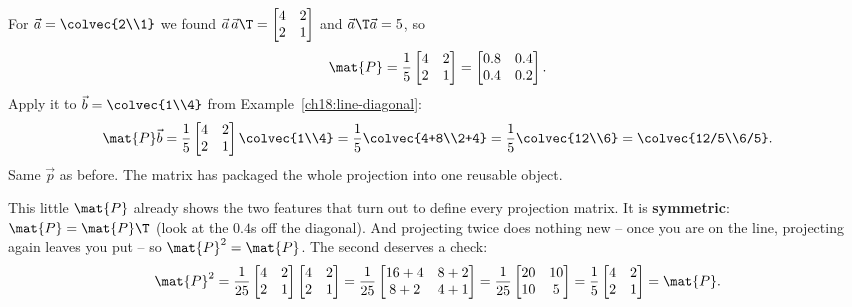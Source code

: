 \begin{example}\label{ch18:line-Pmatrix}
For $\vec{a}=\colvec{2\\1}$ we found $\vec{a}\,\vec{a}\T=\begin{bmatrix}4&2\\2&1\end{bmatrix}$ and
$\vec{a}\T\vec{a}=5$, so
\[
  \mat{P} = \frac{1}{5}\begin{bmatrix} 4 & 2 \\ 2 & 1\end{bmatrix}
          = \begin{bmatrix} 0.8 & 0.4 \\ 0.4 & 0.2 \end{bmatrix}.
\]
Apply it to $\vec{b}=\colvec{1\\4}$ from Example~\ref{ch18:line-diagonal}:
\[
  \mat{P}\vec{b} = \frac{1}{5}\begin{bmatrix}4&2\\2&1\end{bmatrix}\colvec{1\\4}
  = \frac{1}{5}\colvec{4+8\\2+4} = \frac{1}{5}\colvec{12\\6} = \colvec{12/5\\6/5}.
\]
Same $\vec{p}$ as before. The matrix has packaged the whole projection into one reusable object.
\end{example}

This little $\mat{P}$ already shows the two features that turn out to define every projection
matrix. It is \textbf{symmetric}: $\mat{P}=\mat{P}\T$ (look at the $0.4$s off the diagonal). And
projecting twice does nothing new -- once you are on the line, projecting again leaves you put -- so
$\mat{P}^2=\mat{P}$. The second deserves a check:
\[
  \mat{P}^2 = \frac{1}{25}\begin{bmatrix}4&2\\2&1\end{bmatrix}\begin{bmatrix}4&2\\2&1\end{bmatrix}
  = \frac{1}{25}\begin{bmatrix}16+4 & 8+2\\ 8+2 & 4+1\end{bmatrix}
  = \frac{1}{25}\begin{bmatrix}20&10\\10&5\end{bmatrix}
  = \frac{1}{5}\begin{bmatrix}4&2\\2&1\end{bmatrix} = \mat{P}.
\]

